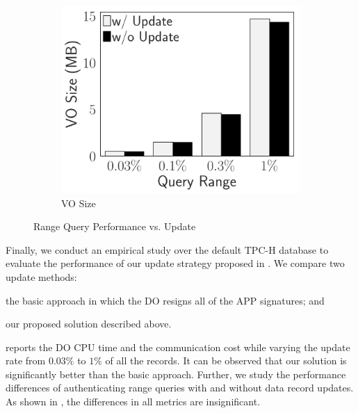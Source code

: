 \begin{figure}[t]
\begin{subfigure}{.33\linewidth}
        \includegraphics[width=\linewidth]{exp-figs/access-control/update_vo.pdf}
        \caption{VO Size}
    \end{subfigure}
    \caption{Range Query Performance vs. Update}\label{exp-fig:access-control:update}
\end{figure}

Finally, we conduct an empirical study over the default TPC-H database to evaluate the performance of our update strategy proposed in . We compare two update methods:
\begin{inlineenum}
    \item the basic approach in which the DO resigns all of the APP signatures; and
    \item our proposed solution described above.
\end{inlineenum}
 reports the DO CPU time and the communication cost while varying the update rate from $0.03\%$ to $1\%$ of all the records. It can be observed that our solution is significantly better than the basic approach. Further, we study the performance differences of authenticating range queries with and without data record updates. As shown in , the differences in all metrics are insignificant.

